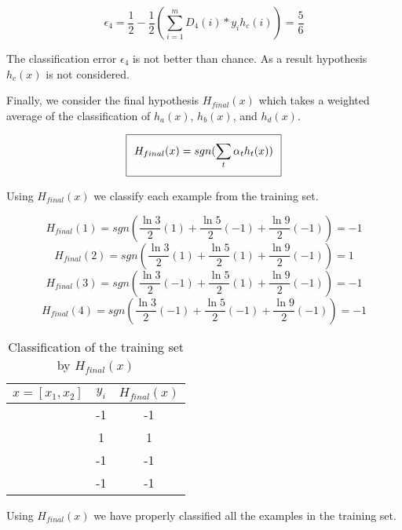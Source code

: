\documentclass[11pt]{article}
\begin{document}
$$\epsilon_4 = \frac{1}{2} - \frac{1}{2}(\sum_{i=1}^m D_4(i)*y_ih_c(i)) = \frac{5}{6}$$

The classification error $\epsilon_4$ is not better than chance. As a result hypothesis $h_c(x)$ is not considered.

Finally, we consider the final hypothesis $H_{final}(x)$ which takes a weighted average of the classification of $h_a(x)$, $h_b(x)$, and $h_d(x)$.

\begin{equation}
\setlength\fboxsep{0.25cm}
\setlength\fboxrule{0.4pt}
\boxed{H_{final}(x) = sgn(\sum_{t}\alpha_th_t(x))}
\end{equation}

Using $H_{final}(x)$ we classify each example from the training set.

$$H_{final}(1) = sgn(\frac{\ln3}{2}(1) + \frac{\ln5}{2}(-1) + \frac{\ln9}{2}(-1)) = -1$$
$$H_{final}(2) = sgn(\frac{\ln3}{2}(1) + \frac{\ln5}{2}(1) + \frac{\ln9}{2}(-1)) = 1$$
$$H_{final}(3) = sgn(\frac{\ln3}{2}(-1) + \frac{\ln5}{2}(1) + \frac{\ln9}{2}(-1)) = -1$$
$$H_{final}(4) = sgn(\frac{\ln3}{2}(-1) + \frac{\ln5}{2}(-1) + \frac{\ln9}{2}(-1)) = -1$$

\begin{table}[H]
\centering
{\renewcommand{\arraystretch}{1.2}%
\begin{tabular}{| c | c | c |}
\hline
$x = [x_1, x_2]$& $y_i$ & $H_{final}(x)$\\
\hline
[1,1] & -1 & -1\\ \hline
[1,-1] & 1 & 1\\ \hline
[-1,-1] & -1 & -1\\ \hline
[-1,1] & -1 & -1\\ \hline
\end{tabular}}
\caption{Classification of the training set by $H_{final}(x)$}
\end{table}

Using $H_{final}(x)$ we have properly classified all the examples in the training set.
\end{document}
